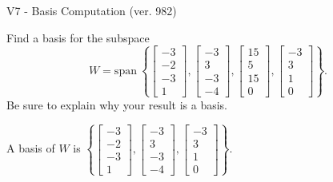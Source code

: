 \begin{exercise}
  \begin{exerciseTitle}V7 - Basis Computation (ver. 982)\end{exerciseTitle}
  \begin{exerciseStatement}
    Find a basis for the subspace 
\[W=\mathrm{span}\ \left\{\left[\begin{array}{r}
-3 \\
-2 \\
-3 \\
1
\end{array}\right] , \left[\begin{array}{r}
-3 \\
3 \\
-3 \\
-4
\end{array}\right] , \left[\begin{array}{r}
15 \\
5 \\
15 \\
0
\end{array}\right] , \left[\begin{array}{r}
-3 \\
3 \\
1 \\
0
\end{array}\right]\right\}.\]
 Be sure to explain why your result is a basis.


  \end{exerciseStatement}
  \begin{exerciseAnswer}
   A basis of \(W\) is  \(\left\{\left[\begin{array}{r}
-3 \\
-2 \\
-3 \\
1
\end{array}\right] , \left[\begin{array}{r}
-3 \\
3 \\
-3 \\
-4
\end{array}\right] , \left[\begin{array}{r}
-3 \\
3 \\
1 \\
0
\end{array}\right]\right\}\).
  


  \end{exerciseAnswer}
\end{exercise}